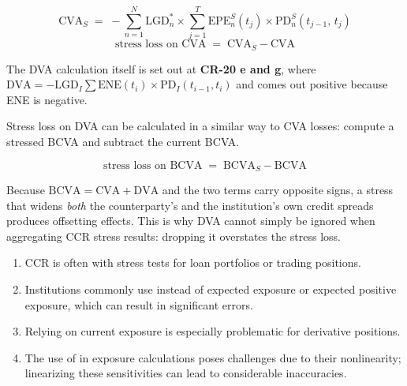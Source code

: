 
\begin{crfmlbox}
\[ \mathrm{CVA}_S \;=\; -\sum_{n=1}^{N} \mathrm{LGD}^{*}_{n}\times
   \sum_{j=1}^{T} \mathrm{EPE}^{S}_{n}(t_j)\times
   \mathrm{PD}^{S}_{n}(t_{j-1},\,t_j) \]
\[ \text{stress loss on CVA} \;=\; \mathrm{CVA}_S - \mathrm{CVA} \]
\end{crfmlbox}


The DVA calculation itself is set out at \textbf{CR-20 e and g}, where
$\mathrm{DVA} = -\mathrm{LGD}_I \sum \mathrm{ENE}(t_i)\times
\mathrm{PD}_I(t_{i-1},t_i)$ and comes out positive because ENE is negative.

\begin{crkeybox}
Stress loss on DVA can be calculated in a similar way to CVA losses: compute a
stressed BCVA and subtract the current BCVA.

\smallskip
\[ \text{stress loss on BCVA} \;=\; \mathrm{BCVA}_S - \mathrm{BCVA} \]

Because $\mathrm{BCVA} = \mathrm{CVA} + \mathrm{DVA}$ and the two terms carry
opposite signs, a stress that widens \emph{both} the counterparty's and the
institution's own credit spreads produces offsetting effects. This is why DVA
cannot simply be ignored when aggregating CCR stress results: dropping it
overstates the stress loss.
\end{crkeybox}


\begin{enumerate}
\item CCR is often  with stress tests for loan portfolios or
trading positions.
\item Institutions commonly use  instead of expected
exposure or expected positive exposure, which can result in significant errors.
\item Relying on current exposure is especially problematic for
 derivative positions.
\item The use of  in exposure calculations poses
challenges due to their nonlinearity; linearizing these sensitivities can lead to
considerable inaccuracies.
\end{enumerate}

